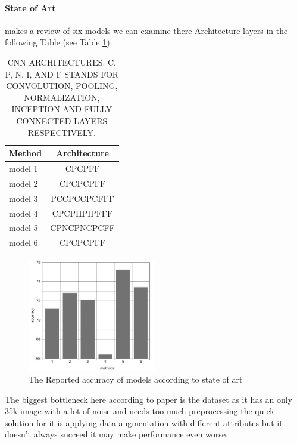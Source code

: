 \paragraph{State of Art} makes a review of six models we can examine there Architecture layers in the following Table (see Table \ref{tab:CH2models}).\newline
\begin{table}
	\begin{center}
		\caption{CNN ARCHITECTURES. C, P, N, I, AND F STANDS FOR CONVOLUTION, POOLING, NORMALIZATION, INCEPTION AND FULLY CONNECTED LAYERS RESPECTIVELY.}
		\label{tab:CH2models}
		\begin{tabular}{l|c}
			\textbf{Method} & \textbf{Architecture} \\
			\hline
			model 1\cite{method_1} & CPCPFF \\
			model 2\cite{method_2} & CPCPCPFF \\
			model 3\cite{method_3} & PCCPCCPCFFF \\
			model 4\cite{method_4} & CPCPIIPIPFFF \\
			model 5\cite{method_5} & CPNCPNCPCFF \\						
			model 6\cite{method_6} & CPCPCPFF \\
		\end{tabular}
	\end{center}
\end{table}
\begin{figure}
	\centering
	\includegraphics[width=0.5\textwidth]{images/stateoart_acc.png}
	\caption{The Reported accuracy of models according to state of art}
\end{figure}

The biggest bottleneck here according to paper\cite{state_of_art} is the dataset as it has an only 35k image with a lot of noise and needs too much preprocessing the quick solution for it is applying data augmentation with different attributes but it doesn't always succeed it may make performance even worse.
